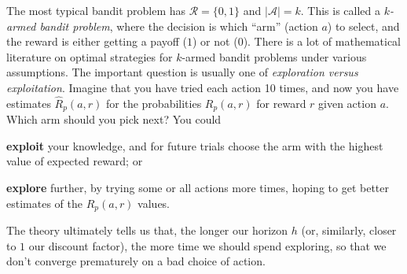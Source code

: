 The most typical bandit problem has $\mathcal{R} = \{0, 1\}$ and
$\lvert \mathcal{A} \rvert = k$.  This is called a {\em $k$-armed
    bandit problem}, where the decision is which
``arm'' (action $a$) to select, and the reward is either getting a
payoff ($1$) or not ($0$).  There is a lot of mathematical literature
on optimal strategies for $k$-armed bandit problems under various
assumptions.  The important question is usually one of {\em
    exploration versus exploitation}.  Imagine that you have tried
each action 10 times, and now you have estimates $\hat{R}_p(a, r)$ for
the probabilities $R_p(a, r)$ for reward $r$ given action $a$.  Which
arm should you pick next?  You could
\begin{description}
  \item{\bf exploit} your knowledge, and for future trials choose the
        arm with the highest value of expected reward; or
  \item{\bf explore} further, by trying some or all actions more times,
        hoping to get better estimates of the $R_p(a, r)$ values.
\end{description}
The theory ultimately tells us that, the longer our horizon $h$ (or,
similarly, closer to $1$ our discount factor), the more time we should
spend exploring, so that we don't converge prematurely on a bad choice
of action.

